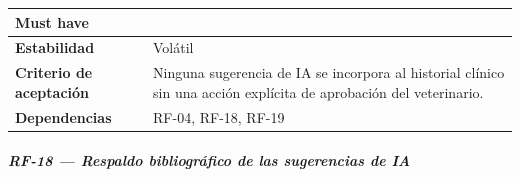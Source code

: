 \documentclass[
]{article}
\begin{document}
{\begin{longtable}[]{|
  >{\raggedright\arraybackslash}p{}|
  >{\raggedright\arraybackslash}p{}|}
\begin{minipage}[t]{\linewidth}
Must have
\end{minipage} \\
\hline
\textbf{Estabilidad} & \begin{minipage}[t]{\linewidth}\raggedright
Volátil
\end{minipage} \\
\hline
\textbf{Criterio de aceptación} &
\begin{minipage}[t]{\linewidth}\raggedright
Ninguna sugerencia de IA se incorpora al historial clínico sin una acción explícita de aprobación del veterinario.
\end{minipage} \\
\hline
\textbf{Dependencias} & \begin{minipage}[t]{\linewidth}\raggedright
RF-04, RF-18, RF-19
\end{minipage} \\
\hline
\end{longtable}
}

\subparagraph{RF-18 --- Respaldo bibliográfico de las sugerencias de IA}\label{rf-18-respaldo-bibliogr-fico-de-las-sugerencia}
\end{document}

